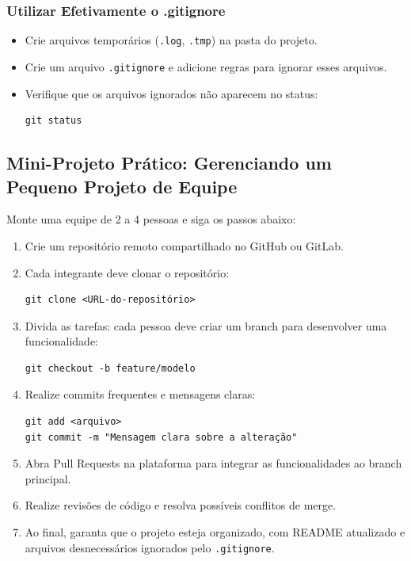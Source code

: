 \subsubsection{Utilizar Efetivamente o .gitignore}
\begin{itemize}
    \item Crie arquivos temporários (\texttt{.log}, \texttt{.tmp}) na pasta do projeto.
    \item Crie um arquivo \texttt{.gitignore} e adicione regras para ignorar esses arquivos.
    \item Verifique que os arquivos ignorados não aparecem no status:
    \begin{lstlisting}[style=shellstyle]
git status
    \end{lstlisting}
\end{itemize}

\subsection{Mini-Projeto Prático: Gerenciando um Pequeno Projeto de Equipe}

Monte uma equipe de 2 a 4 pessoas e siga os passos abaixo:

\begin{enumerate}
    \item Crie um repositório remoto compartilhado no GitHub ou GitLab.
    \item Cada integrante deve clonar o repositório:
    \begin{lstlisting}[style=shellstyle]
git clone <URL-do-repositório>
    \end{lstlisting}
    \item Divida as tarefas: cada pessoa deve criar um branch para desenvolver uma funcionalidade:
    \begin{lstlisting}[style=shellstyle]
git checkout -b feature/modelo
    \end{lstlisting}
    \item Realize commits frequentes e mensagens claras:
    \begin{lstlisting}[style=shellstyle]
git add <arquivo>
git commit -m "Mensagem clara sobre a alteração"
    \end{lstlisting}
    \item Abra Pull Requests na plataforma para integrar as funcionalidades ao branch principal.
    \item Realize revisões de código e resolva possíveis conflitos de merge.
    \item Ao final, garanta que o projeto esteja organizado, com README atualizado e arquivos desnecessários ignorados pelo \texttt{.gitignore}.
\end{enumerate}

